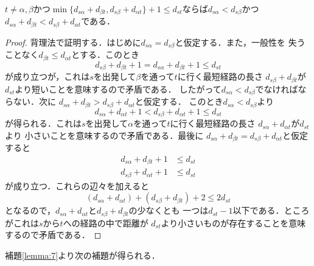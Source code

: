 \begin{lemma}
\rm 
$t \neq \alpha, \beta$かつ$\min\{d_{s\alpha}+d_{\beta t}, d_{s\beta}+d_{\alpha t}\}+1
\leq d_{st}$ならば$d_{s\alpha}<d_{s\beta}$かつ$d_{s\alpha}+d_{\beta t} < d_{s\beta}+d_{\alpha t}$である．
\label{lemma:7}
\end{lemma}
\begin{proof}
背理法で証明する．はじめに$d_{s\alpha}=d_{s\beta}$と仮定する．また，一般性を
失うことなく$d_{\beta t} \leq d_{\alpha t}$とする．このとき
\[
 d_{s\beta}+d_{\beta t}+1=d_{s\alpha}+d_{\beta t}+1 \leq d_{st}
\]
が成り立つが，これは$s$を出発して$\beta$を通って$t$に行く最短経路の長さ
$d_{s\beta}+d_{\beta t}$が$d_{st}$より短いことを意味するので矛盾である．
したがって$d_{s\alpha}<d_{s\beta}$でなければならない．次に
$d_{s\alpha}+d_{\beta t} > d_{s\beta}+d_{\alpha t}$と仮定する．
このとき$d_{s\alpha}<d_{s\beta}$より
\[
 d_{s\alpha}+d_{\alpha t}+1 < d_{s\beta}+d_{\alpha t}+1 \leq d_{st}
\]
が得られる．これは$s$を出発して$\alpha$を通って$t$に行く最短経路の長さ
$d_{s\alpha}+d_{\alpha t}$が$d_{st}$より
小さいことを意味するので矛盾である．最後に
$d_{s\alpha}+d_{\beta t} = d_{s\beta}+d_{\alpha t}$と仮定すると
\begin{align}
d_{s\alpha}+d_{\beta t}+1 &\leq d_{st} \\
d_{s\beta }+d_{\alpha t}+1 &\leq d_{st}
\end{align}
が成り立つ．これらの辺々を加えると
\[
 (d_{s\alpha}+d_{\alpha t})+(d_{s\beta}+d_{\beta t})+2 \leq 2d_{st}
\]
となるので，$d_{s\alpha}+d_{\alpha t}$と$d_{s\beta}+d_{\beta t}$の少なくとも
一つは$d_{st}-1$以下である．ところがこれは$s$から$t$への経路の中で距離が
$d_{st}$より小さいものが存在することを意味するので矛盾である．
\end{proof}
%

補題\ref{lemma:7}より次の補題が得られる．

